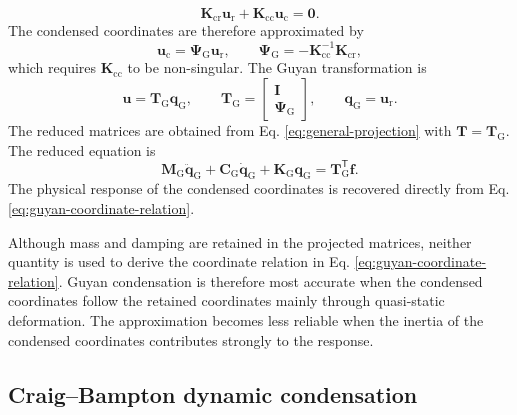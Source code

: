 \documentclass[11pt,a4paper]{article}
\numberwithin{equation}{section}
\begin{document}
\begin{equation}
	\mathbf{K}_{\mathrm{cr}}\bm{u}_{\mathrm{r}}+\mathbf{K}_{\mathrm{cc}}\bm{u}_{\mathrm{c}}=\bm{0}.
	\label{eq:guyan-static-equilibrium}
\end{equation}
The condensed coordinates are therefore approximated by
\begin{equation}
	\bm{u}_{\mathrm{c}}=\bm{\Psi}_{\mathrm{G}}\bm{u}_{\mathrm{r}},
	\qquad
	\bm{\Psi}_{\mathrm{G}}=-\mathbf{K}_{\mathrm{cc}}^{-1}\mathbf{K}_{\mathrm{cr}},
	\label{eq:guyan-coordinate-relation}
\end{equation}
which requires \(\mathbf{K}_{\mathrm{cc}}\) to be non-singular.
The Guyan transformation is
\begin{equation}
	\bm{u}=\mathbf{T}_{\mathrm{G}}\bm{q}_{\mathrm{G}},
	\qquad
	\mathbf{T}_{\mathrm{G}}=
	\begin{bmatrix}
		\mathbf{I}\\
		\bm{\Psi}_{\mathrm{G}}
	\end{bmatrix},
	\qquad
	\bm{q}_{\mathrm{G}}=\bm{u}_{\mathrm{r}}.
	\label{eq:guyan-transformation}
\end{equation}
The reduced matrices are obtained from Eq. \eqref{eq:general-projection} with \(\mathbf{T}=\mathbf{T}_{\mathrm{G}}\). The reduced equation is
\begin{equation}
	\mathbf{M}_{\mathrm{G}}\ddot{\bm{q}}_{\mathrm{G}}
	+\mathbf{C}_{\mathrm{G}}\dot{\bm{q}}_{\mathrm{G}}
	+\mathbf{K}_{\mathrm{G}}\bm{q}_{\mathrm{G}}
	=\mathbf{T}_{\mathrm{G}}^{\mathsf{T}}\bm{f}.
	\label{eq:guyan-reduced-eom}
\end{equation}
The physical response of the condensed coordinates is recovered directly from Eq. \eqref{eq:guyan-coordinate-relation}.

Although mass and damping are retained in the projected matrices, neither quantity is used to derive the coordinate relation in Eq. \eqref{eq:guyan-coordinate-relation}. Guyan condensation is therefore most accurate when the condensed coordinates follow the retained coordinates mainly through quasi-static deformation. The approximation becomes less reliable when the inertia of the condensed coordinates contributes strongly to the response.




\subsection{Craig--Bampton dynamic condensation}
\label{sec:cb-condensation}
\end{document}
